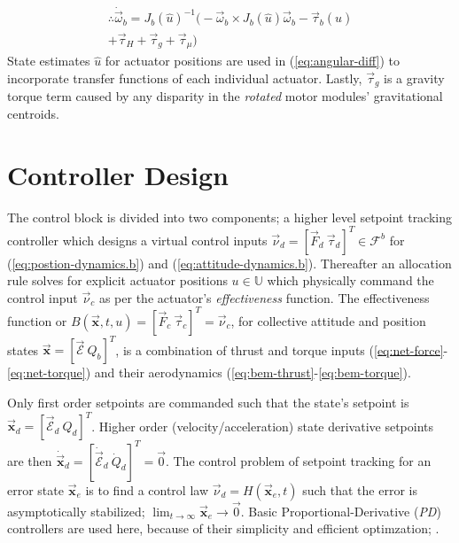 \documentclass[a4paper, 10pt, conference]{ieeeconf}
\begin{document}
\begin{multline}\label{eq:angular-diff}
\therefore \dot{\vec{\omega}}_b = J_b(\hat{u})^{-1}\big(-\vec{\omega}_b\times J_b(\hat{u}) \vec{\omega}_b-\vec{\tau}_b(\hat{u})
\\
+\vec{\tau}_H+\vec{\tau}_g+\vec{\tau}_\mu \big)
\end{multline}
State estimates $\hat{u}$ for actuator positions are used in (\ref{eq:angular-diff}) to incorporate transfer functions of each individual actuator. Lastly, $\vec{\tau}_g$ is a gravity torque term caused by any disparity in the \emph{rotated} motor modules' gravitational centroids.
\section{Controller Design}
\label{sec:control}
The control block is divided into two components; a higher level setpoint tracking controller which designs a virtual control inputs $\vec{\nu}_d=[\vec{F}_d ~ \vec{\tau}_d]^T\in\mathcal{F}^{b}$ for (\ref{eq:postion-dynamics.b}) and (\ref{eq:attitude-dynamics.b}). Thereafter an allocation rule solves for explicit actuator positions $u\in\mathbb{U}$ which physically command the control input $\vec{\nu}_c$ as per the actuator's \emph{effectiveness} function. The effectiveness function or $B(\vec{\mathbf{x}},t,u)=[\vec{F}_c~\vec{\tau}_c]^T=\vec{\nu}_c$, for collective attitude and position states $\vec{\mathbf{x}}=[\vec{\mathcal{E}} ~ Q_b]^T$, is a combination of thrust and torque inputs (\ref{eq:net-force}-\ref{eq:net-torque}) and their aerodynamics (\ref{eq:bem-thrust}-\ref{eq:bem-torque}).
\par
Only first order setpoints are commanded such that the state's setpoint is $\vec{\mathbf{x}}_d=[\vec{\mathcal{E}}_d ~ Q_d]^T$. Higher order (velocity/acceleration) state derivative setpoints are then $\dot{\vec{\mathbf{x}}}_d=[\dot{\vec{\mathcal{E}}}_d ~ \dot{Q}_d]^T=\vec{0}$. The control problem of setpoint tracking for an error state $\vec{\mathbf{x}}_e$ is to find a control law $\vec{\nu}_d=H(\vec{\mathbf{x}}_e,t)$ such that the error is asymptotically stabilized; $\lim_{t\rightarrow\infty}\vec{\mathbf{x}}_e\rightarrow\vec{0}$. Basic Proportional-Derivative (\emph{PD}) controllers are used here, because of their simplicity and efficient optimzation; \cite{dualaxistilting}.
\end{document}

